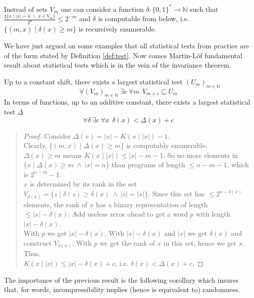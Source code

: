 \begin{remark}
Instead of sets $V_m$ one can consider a function
$\delta:{\{0,1\}^*}\to{\mathbb N}$ such that
$\frac{\sharp\{x \mid |x|=n\ \wedge\ x\in V_m\}}{2^n}\leq 2^{-m}$
and $\delta$ is computable from below, i.e.
$\{(m,x) \mid \delta(x)\geq m\}$ is recursively enumerable.
\end{remark}
We have just argued on some examples that all statistical tests
from practice are of the form stated by Definition \ref{def:test}.
Now comes Martin-L\"of fundamental result about statistical tests
which is in the vein of the invariance theorem.
\begin{theorem} [Martin-L\"of, 1965]\label{thm:test}
Up to a constant shift, there exists a largest statistical test
$(U_m)_{m\in{\mathbb N}}$
$$
\forall (V_m)_{m\in{\mathbb N}}\ \exists c\ \forall m\ \
V_{m+c} \subseteq U_m
$$
In terms of functions, up to an additive constant,
there exists a largest statistical test $\Delta$
$$
\forall \delta\ \exists c\ \forall x\ \
\delta(x)<\Delta(x)+c
$$
\end{theorem}
{\small\begin{quote}
\begin{proof}
Consider $\Delta(x)=|x|-K(x\mid|x|)-1$.
\\
Clearly, $\{(m,x) \mid \Delta(x)\geq m\}$ is computably enumerable.
\\
$\Delta(x)\geq m$ means $K(x\mid|x|)\leq |x|-m-1$.
So no more elements in $\{x \mid \Delta(x)\geq m\ \wedge\ |x|=n\}$
than programs of length $\leq n-m-1$, which is $2^{n-m}-1$.
\\
$x$ is determined by its rank in the set
$V_{\delta(x)}=\{z \mid \delta(z)\geq \delta(x)\ \wedge\ |z|=|x|\}$.
Since this set has $\leq 2^{n-\delta(x)}$ elements,
the rank of $x$ has a binary representation of length
$\leq |x|-\delta(x)$.
Add useless zeros ahead to get a word $p$ with length
$|x|-\delta(x)$.
\\
With $p$ we get $|x|-\delta(x)$.
With $|x|-\delta(x)$ and $|x|$ we get $\delta(x)$ and construct
$V_{\delta(x)}$. With $p$ we get the rank of $x$ in this set,
hence we get $x$.
Thus,\\
$K(x\mid|x|) \leq |x|-\delta(x) +c$,
i.e. $\delta(x)<\Delta(x)+c$.
\end{proof}
\end{quote}}
The importance of the previous result is the following corollary
which insures that, for words,
incompressibility implies (hence is equivalent to) randomness.
